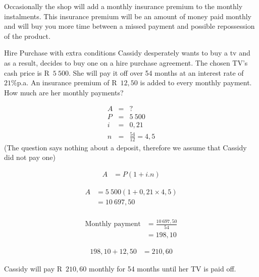 Occasionally the shop will add a monthly insurance premium to the monthly instalments. This insurance premium will be an amount of money paid monthly and will buy you more time between a missed payment and possible repossession of the product.


\begin{wex}{Hire Purchase with extra conditions}{
    Cassidy desperately wants to buy a tv and as a result, decides to buy one on a hire purchase agreement. The chosen TV’s cash price is R~$5~500$. She will pay it off over 54 months at an interest rate of $21\%$p.a. An insurance premium of R~$12,50$ is added to every monthly payment. How much are her monthly payments?}{

    \begin{eqnarray*}
	A &=& ?\\
	P &=& 5~500\\
	i &=& 0,21\\
	n &=& \frac{54}{12} = 4,5
    \end{eqnarray*}
(The question says nothing about a deposit, therefore we assume that Cassidy did not pay one)

    \begin{align*}
	    A &= P(1 + i . n)
    \end{align*}

    \begin{align*}
	A &= 5~500(1 + 0,21 \times 4,5)\\
	  &= 10~697,50\\
    \end{align*}

    \begin{align*}
	\text{Monthly payment} &= \frac{10~697,50}{54}\\
			&= 198,10
    \end{align*}

    \begin{align*}
	198,10 + 12,50 &= 210,60
    \end{align*}

    Cassidy will pay R~$210,60$ monthly for 54 months until her TV is paid off.
}
\end{wex}




